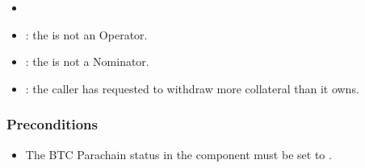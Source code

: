 \documentclass[a4paper,10pt,english]{sphinxmanual}
\begin{document}
\begin{itemize}
\item {} 

\end{itemize}

\begin{itemize}
\item {} 
: the  is not an Operator.

\item {} 
: the  is not a Nominator.

\item {} 
: the caller has requested to withdraw more collateral than it owns.

\end{itemize}


\subsubsection{Preconditions}
\label{\detokenize{spec/nomination:id23}}\begin{itemize}
\item {} 
The BTC Parachain status in the {\hyperref[\detokenize{spec/security:security}]{}} component must be set to .

\end{itemize}
\end{document}
